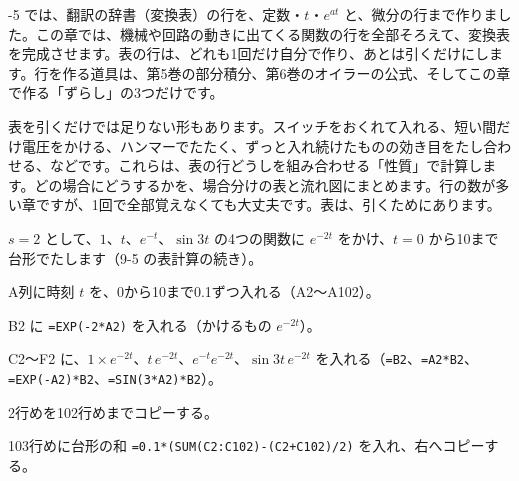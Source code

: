 -5 では、翻訳の辞書（変換表）の行を、定数・$t$・$e^{at}$ と、微分の行まで作りました。この章では、機械や回路の動きに出てくる関数の行を全部そろえて、変換表を完成させます。表の行は、どれも1回だけ自分で作り、あとは引くだけにします。行を作る道具は、第5巻の部分積分、第6巻のオイラーの公式、そしてこの章で作る「ずらし」の3つだけです。

表を引くだけでは足りない形もあります。スイッチをおくれて入れる、短い間だけ電圧をかける、ハンマーでたたく、ずっと入れ続けたものの効き目をたし合わせる、などです。これらは、表の行どうしを組み合わせる「性質」で計算します。どの場合にどうするかを、場合分けの表と流れ図にまとめます。行の数が多い章ですが、1回で全部覚えなくても大丈夫です。表は、引くためにあります。

\begin{omoidasou}
\end{omoidasou}

\begin{yattemiyou}
$s=2$ として、$1$、$t$、$e^{-t}$、$\sin3t$ の4つの関数に $e^{-2t}$ をかけ、$t=0$ から10まで台形でたします（9-5 の表計算の続き）。
\begin{enumerate}[label={\bkcircled[bkGreen]{\arabic*}}, leftmargin=2.4\zw, itemsep=1pt, topsep=2pt]
\item A列に時刻 $t$ を、0から10まで0.1ずつ入れる（A2〜A102）。
\item B2 に \texttt{=EXP(-2*A2)} を入れる（かけるもの $e^{-2t}$）。
\item C2〜F2 に、$1\times e^{-2t}$、$t\,e^{-2t}$、$e^{-t}e^{-2t}$、$\sin3t\,e^{-2t}$ を入れる（\texttt{=B2}、\texttt{=A2*B2}、\texttt{=EXP(-A2)*B2}、\texttt{=SIN(3*A2)*B2}）。
\item 2行めを102行めまでコピーする。
\item 103行めに台形の和 \texttt{=0.1*(SUM(C2:C102)-(C2+C102)/2)} を入れ、右へコピーする。
\end{enumerate}
\end{yattemiyou}

